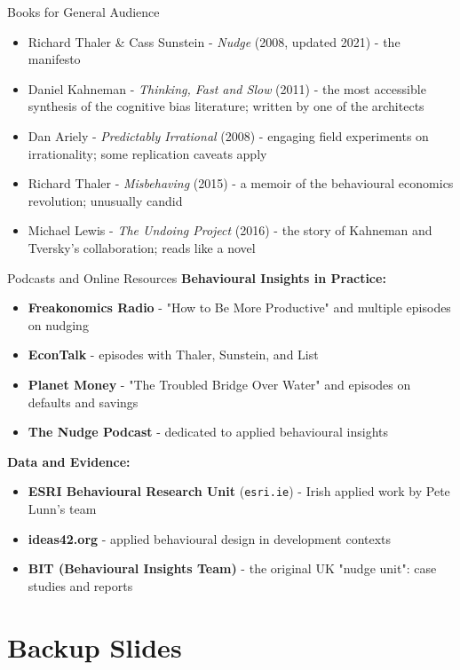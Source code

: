 \documentclass[10pt]{beamer}
\begin{document}
\begin{frame}{Books for General Audience}
\begin{itemize}
\item Richard Thaler \& Cass Sunstein - \emph{Nudge} (2008, updated 2021) - the manifesto
\item Daniel Kahneman - \emph{Thinking, Fast and Slow} (2011) - the most accessible synthesis of the cognitive bias literature; written by one of the architects
\item Dan Ariely - \emph{Predictably Irrational} (2008) - engaging field experiments on irrationality; some replication caveats apply
\item Richard Thaler - \emph{Misbehaving} (2015) - a memoir of the behavioural economics revolution; unusually candid
\item Michael Lewis - \emph{The Undoing Project} (2016) - the story of Kahneman and Tversky's collaboration; reads like a novel
\end{itemize}
\end{frame}


\begin{frame}{Podcasts and Online Resources}
\textbf{Behavioural Insights in Practice:}
\begin{itemize}
\item \textbf{Freakonomics Radio} - "How to Be More Productive" and multiple episodes on nudging
\item \textbf{EconTalk} - episodes with Thaler, Sunstein, and List
\item \textbf{Planet Money} - "The Troubled Bridge Over Water" and episodes on defaults and savings
\item \textbf{The Nudge Podcast} - dedicated to applied behavioural insights
\end{itemize}


\textbf{Data and Evidence:}
\begin{itemize}
\item \textbf{ESRI Behavioural Research Unit} (\texttt{esri.ie}) - Irish applied work by Pete Lunn's team
\item \textbf{ideas42.org} - applied behavioural design in development contexts
\item \textbf{BIT (Behavioural Insights Team)} - the original UK "nudge unit": case studies and reports
\end{itemize}
\end{frame}



\appendix
\section*{Backup Slides}
\end{document}
